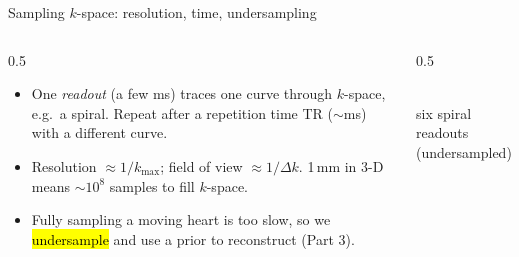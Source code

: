 \begin{frame}{Sampling $k$-space: resolution, time, undersampling}
\begin{columns}[c]
\begin{column}{0.5\textwidth}
\begin{itemize}\small
\item One \emph{readout} (a few ms) traces one curve through $k$-space, e.g.\ a spiral. Repeat after a repetition time TR ($\sim$ms) with a different curve.
\item Resolution $\approx1/k_{\max}$; field of view $\approx1/\Delta k$. 1\,mm in 3-D means $\sim10^{8}$ samples to fill $k$-space.
\item Fully sampling a moving heart is too slow, so we \hl{undersample} and use a prior to reconstruct (Part 3).
\end{itemize}
\end{column}
\begin{column}{0.5\textwidth}
\centering
{}\\[-1mm]
{\scriptsize six spiral readouts (undersampled)}
\end{column}
\end{columns}
\end{frame}


